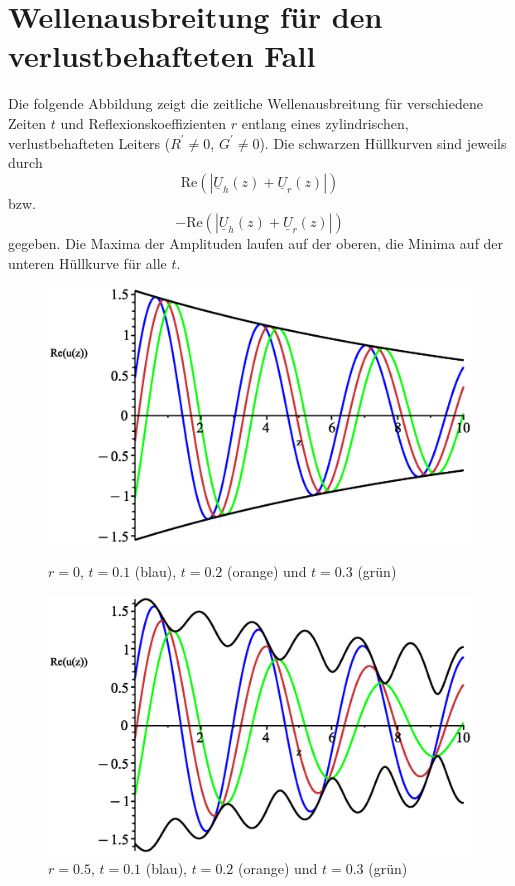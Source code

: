 \documentclass[paper=a4, parskip=half-, ngerman, fontsize=11pt]{scrreprt}
\begin{document}
\chapter{Wellenausbreitung für den verlustbehafteten Fall}
Die folgende Abbildung zeigt die zeitliche Wellenausbreitung für verschiedene Zeiten $t$ und Reflexionskoeffizienten
$r$ entlang eines zylindrischen, verlustbehafteten Leiters (\mbox{$R^{\prime} \neq 0$}, $G^{\prime} \neq 0$). Die
schwarzen
Hüllkurven sind jeweils durch \[
\mathrm{Re} ( \left| \underline{U}_{h}(z) + \underline{U}_{r}(z) \right| )
\] bzw. \[
- \mathrm{Re} ( \left| \underline{U}_{h}(z) + \underline{U}_{r}(z) \right| )
\] gegeben. Die Maxima der Amplituden laufen auf der oberen, die Minima auf der unteren Hüllkurve für alle $t$.
\begin{figure}[!htpb]
    \begin{minipage}{0.45\textwidth}
        \centering
        \includegraphics[width=\linewidth]{../graphics/Enveloppe/verlustbehaftet/R0}
        \caption*{$r=0$, $t=0.1$ (blau), $t=0.2$ (orange) und $t=0.3$ (grün)}
    \end{minipage}\hfill
    \begin{minipage}{0.45\textwidth}
        \centering
        \includegraphics[width=\linewidth]{../graphics/Enveloppe/verlustbehaftet/R0.5}
        \caption*{$r=0.5$, $t=0.1$ (blau), $t=0.2$ (orange) und $t=0.3$ (grün)}
    \end{minipage}


\end{figure}
\end{document}
